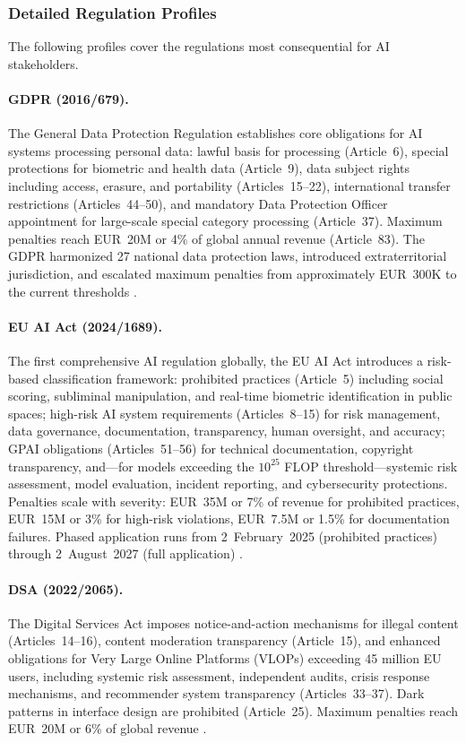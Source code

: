 \documentclass[11pt,a4paper]{article}
\begin{document}
\subsubsection{Detailed Regulation Profiles}

The following profiles cover the regulations most consequential for AI stakeholders.

\paragraph{GDPR (2016/679).}
The General Data Protection Regulation establishes core obligations for AI systems processing personal data: lawful basis for processing (Article~6), special protections for biometric and health data (Article~9), data subject rights including access, erasure, and portability (Articles~15--22), international transfer restrictions (Articles~44--50), and mandatory Data Protection Officer appointment for large-scale special category processing (Article~37). Maximum penalties reach EUR~20M or 4\% of global annual revenue (Article~83). The GDPR harmonized 27 national data protection laws, introduced extraterritorial jurisdiction, and escalated maximum penalties from approximately EUR~300K to the current thresholds \cite{gdpr}.

\paragraph{EU AI Act (2024/1689).}
The first comprehensive AI regulation globally, the EU AI Act introduces a risk-based classification framework: prohibited practices (Article~5) including social scoring, subliminal manipulation, and real-time biometric identification in public spaces; high-risk AI system requirements (Articles~8--15) for risk management, data governance, documentation, transparency, human oversight, and accuracy; GPAI obligations (Articles~51--56) for technical documentation, copyright transparency, and---for models exceeding the $10^{25}$ FLOP threshold---systemic risk assessment, model evaluation, incident reporting, and cybersecurity protections. Penalties scale with severity: EUR~35M or 7\% of revenue for prohibited practices, EUR~15M or 3\% for high-risk violations, EUR~7.5M or 1.5\% for documentation failures. Phased application runs from 2~February~2025 (prohibited practices) through 2~August~2027 (full application) \cite{aiact}.

\paragraph{DSA (2022/2065).}
The Digital Services Act imposes notice-and-action mechanisms for illegal content (Articles~14--16), content moderation transparency (Article~15), and enhanced obligations for Very Large Online Platforms (VLOPs) exceeding 45 million EU users, including systemic risk assessment, independent audits, crisis response mechanisms, and recommender system transparency (Articles~33--37). Dark patterns in interface design are prohibited (Article~25). Maximum penalties reach EUR~20M or 6\% of global revenue \cite{dsa}.
\end{document}
